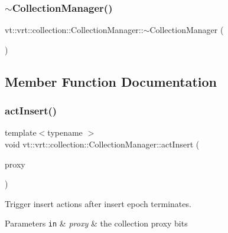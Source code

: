 \subsubsection{\texorpdfstring{$\sim$\+Collection\+Manager()}{~CollectionManager()}}
{\footnotesize\ttfamily vt\+::vrt\+::collection\+::\+Collection\+Manager\+::$\sim$\+Collection\+Manager (\begin{DoxyParamCaption}{ }\end{DoxyParamCaption})\hspace{0.3cm}{\ttfamily [virtual]}}



\subsection{Member Function Documentation}
\mbox{\label{structvt_1_1vrt_1_1collection_1_1_collection_manager_aba521bf30580ffe5a815b5e50bfbcbfe}} 
\subsubsection{\texorpdfstring{act\+Insert()}{actInsert()}}
{\footnotesize\ttfamily template$<$typename $>$ \\
void vt\+::vrt\+::collection\+::\+Collection\+Manager\+::act\+Insert (\begin{DoxyParamCaption}\item[{\hyperlink{namespacevt_a1b417dd5d684f045bb58a0ede70045ac}{Virtual\+Proxy\+Type} const \&}]{proxy }\end{DoxyParamCaption})}



Trigger insert actions after insert epoch terminates. 


\begin{DoxyParams}[1]{Parameters}
\mbox{\tt in}  & {\em proxy} & the collection proxy bits \\
\hline
\end{DoxyParams}
\mbox{\label{structvt_1_1vrt_1_1collection_1_1_collection_manager_a0c2b3a0d98264432181392ff178d5782}} 
